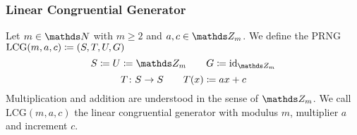 \documentclass{stdlocal}
\begin{document}
    \subsubsection*{Linear Congruential Generator} %
    \label{ssub:linear_congruential_generator}
      \begin{definition}
        Let $m\in\setNatural$ with $m\geq 2$ and $a,c\in\setInteger_m$.
        We define the PRNG $\mathrm{LCG}(m,a,c) \coloneqq (S,T,U,G)$
        \[
          S \define U \define \setInteger_m
          \separate
          G \define \identity_{\setInteger_m}
        \]
        \[
          T\colon S\to S
          \qquad
          T(x) \coloneqq a x + c
        \]
        Multiplication and addition are understood in the sense of $\setInteger_m$.
        We call $\mathrm{LCG}(m,a,c)$ the linear congruential generator with modulus $m$, multiplier $a$ and increment $c$.
      \end{definition}
\end{document}
